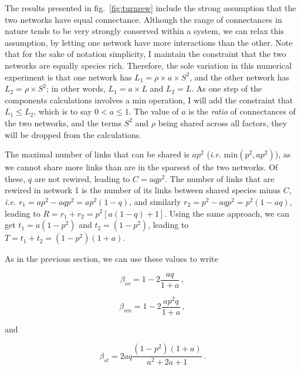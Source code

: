 \documentclass[11pt]{article}
\begin{document}
The results presented in fig.~\ref{fig:turnrew} include the strong
assumption that the two networks have equal connectance. Although the
range of connectances in nature tends to be very strongly conserved
within a system, we can relax this assumption, by letting one network
have more interactions than the other. Note that for the sake of
notation simplicity, I maintain the constraint that the two networks are
equally species rich. Therefore, the sole variation in this numerical
experiment is that one network has \(L_1 = \rho\times a\times S^2\), and
the other network has \(L_2 = \rho\times S^2\); in other words,
\(L_1 = a\times L\) and \(L_2 = L\). As one step of the components
calculations involves a \(\text{min}\) operation, I will add the
constraint that \(L_1 \le L_2\), which is to say \(0 < a \le 1\). The
value of \(a\) is the \emph{ratio} of connectances of the two networks,
and the terms \(S^2\) and \(\rho\) being shared across all factors, they
will be dropped from the calculations.

The maximal number of links that can be shared is \(ap^2\) (\emph{i.e.}
\(\text{min}(p^2, ap^2)\)), as we cannot share more links than are in
the sparsest of the two networks. Of these, \(q\) are not rewired,
leading to \(C = aqp^2\). The number of links that are rewired in
network 1 is the number of its links between shared species minus \(C\),
\emph{i.e.} \(r_1 = ap^2 - aqp^2 = ap^2(1-q)\), and similarly
\(r_2 = p^2 - aqp^2 = p^2(1-aq)\), leading to
\(R = r_1 + r_2 = p^2 \left[a(1-q)+1\right]\). Using the same approach,
we can get \(t_1 = a(1-p^2)\) and \(t_2 = (1-p^2)\), leading to
\(T = t_1 + t_2 = (1-p^2)(1+a)\).

As in the previous section, we can use these values to write

\[\beta_{os} = 1 - 2\frac{aq}{1+a}\,,\]

\[\beta_{wn} = 1 - 2\frac{ap^2q}{1+a}\,,\]

and

\[\beta_{st} = 2aq\frac{(1-p^2)(1+a)}{a^2 + 2a + 1}\,.\]
\end{document}
